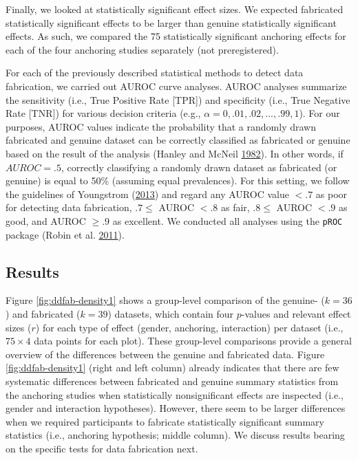 \documentclass[a5paper]{book}
\begin{document}
Finally, we looked at statistically significant effect sizes. We
expected fabricated statistically significant effects to be larger than
genuine statistically significant effects. As such, we compared the 75
statistically significant anchoring effects for each of the four
anchoring studies separately (not preregistered).

For each of the previously described statistical methods to detect data
fabrication, we carried out AUROC curve analyses. AUROC analyses
summarize the sensitivity (i.e., True Positive Rate {[}TPR{]}) and
specificity (i.e., True Negative Rate {[}TNR{]}) for various decision
criteria (e.g., \(\alpha=0, .01, .02, ..., .99, 1\)). For our purposes,
AUROC values indicate the probability that a randomly drawn fabricated
and genuine dataset can be correctly classified as fabricated or genuine
based on the result of the analysis (Hanley and McNeil
\protect\hyperlink{ref-doi:10.1148ux2fradiology.143.1.7063747}{1982}).
In other words, if \(AUROC=.5\), correctly classifying a randomly drawn
dataset as fabricated (or genuine) is equal to 50\% (assuming equal
prevalences). For this setting, we follow the guidelines of Youngstrom
(\protect\hyperlink{ref-doi:10.1093ux2fjpepsyux2fjst062}{2013}) and
regard any AUROC value \(<.7\) as poor for detecting data fabrication,
\(.7\leq\) AUROC \(<.8\) as fair, \(.8\leq\) AUROC \(<.9\) as good, and
AUROC \(\geq.9\) as excellent. We conducted all analyses using the
\texttt{pROC} package (Robin et al.
\protect\hyperlink{ref-doi:10.1186ux2f1471-2105-12-77}{2011}).

\subsection{Results}\label{results-3}

Figure \ref{fig:ddfab-density1} shows a group-level comparison of the
genuine- (\(k=36\)) and fabricated (\(k=39\)) datasets, which contain
four \(p\)-values and relevant effect sizes (\(r\)) for each type of
effect (gender, anchoring, interaction) per dataset (i.e., \(75\times4\)
data points for each plot). These group-level comparisons provide a
general overview of the differences between the genuine and fabricated
data. Figure \ref{fig:ddfab-density1} (right and left column) already
indicates that there are few systematic differences between fabricated
and genuine summary statistics from the anchoring studies when
statistically nonsignificant effects are inspected (i.e., gender and
interaction hypotheses). However, there seem to be larger differences
when we required participants to fabricate statistically significant
summary statistics (i.e., anchoring hypothesis; middle column). We
discuss results bearing on the specific tests for data fabrication next.
\end{document}
